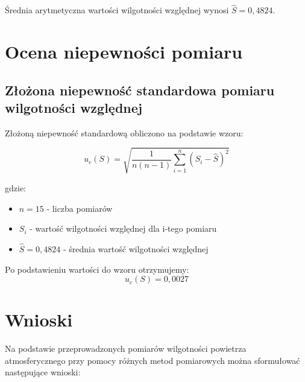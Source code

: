 \documentclass[a4paper,12pt]{article}
\begin{document}
Średnia arytmetyczna wartości wilgotności względnej wynosi $\hat{S} = 0{,}4824$.

\section{Ocena niepewności pomiaru}

\subsection{Złożona niepewność standardowa pomiaru wilgotności względnej}

Złożoną niepewność standardową obliczono na podstawie wzoru:

\begin{equation}
    u_c(S) = \sqrt{\frac{1}{n(n-1)} \sum_{i=1}^{n} (S_i - \hat{S})^2}
\end{equation}

gdzie:
\begin{itemize}
    \item $n = 15$ - liczba pomiarów
    \item $S_i$ - wartość wilgotności względnej dla i-tego pomiaru
    \item $\hat{S} = 0{,}4824$ - średnia wartość wilgotności względnej
\end{itemize}

Po podstawieniu wartości do wzoru otrzymujemy:
\begin{equation}
    u_c(S) = 0{,}0027
\end{equation}


\section{Wnioski}

Na podstawie przeprowadzonych pomiarów wilgotności powietrza atmosferycznego przy pomocy różnych metod pomiarowych można sformułować następujące wnioski:
\end{document}
